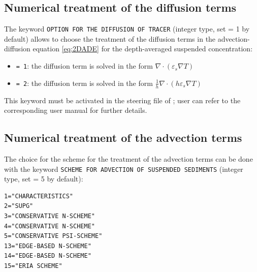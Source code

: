 \subsection{Numerical treatment of the diffusion terms}
The keyword \texttt{OPTION FOR THE DIFFUSION OF TRACER} (integer type, set {\ttfamily = 1} by default) allows to choose the treatment of the diffusion terms in the advection-diffusion equation \ref{eq:2DADE} for the depth-averaged suspended concentration:
\begin{itemize}
\item \texttt{= 1}: the diffusion term is solved in the form $\nabla\cdot(\varepsilon_s\nabla T)$
\item \texttt{= 2}: the diffusion term is solved in the form $\frac{1}{h}\nabla\cdot(h\varepsilon_s\nabla T)$
\end{itemize}
This keyword must be activated in the steering file of ; user can refer to the corresponding user manual for further details.
\subsection{Numerical treatment of the advection terms}
The choice for the scheme for the treatment of the advection terms can be done with the keyword \texttt{SCHEME FOR ADVECTION OF SUSPENDED SEDIMENTS} (integer type, set {\ttfamily = 5} by default):
\begin{lstlisting}[frame=trBL]
1="CHARACTERISTICS"
2="SUPG"
3="CONSERVATIVE N-SCHEME"
4="CONSERVATIVE N-SCHEME"
5="CONSERVATIVE PSI-SCHEME"
13="EDGE-BASED N-SCHEME"
14="EDGE-BASED N-SCHEME"
15="ERIA SCHEME"
\end{lstlisting}


